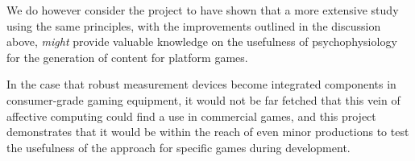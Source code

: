 \documentclass{llncs}
\begin{document}
We do however consider the project to have shown that a more extensive study using the same principles, with the improvements outlined in the discussion above, \emph{might} provide valuable knowledge on the usefulness of psychophysiology for the generation of content for platform games.

In the case that robust measurement devices become integrated components in consumer-grade gaming equipment, it would not be far fetched that this vein of affective computing could find a use in commercial games, and this project demonstrates that it would be within the reach of even minor productions to test the usefulness of the approach for specific games during development.


\end{document}
